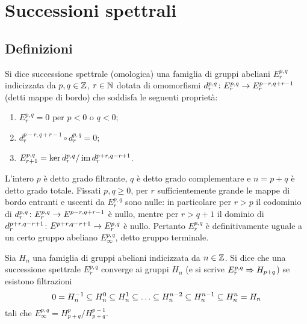 \chapter{Successioni spettrali}
\section{Definizioni}
\begin{definition}
Si dice successione spettrale (omologica) una famiglia di gruppi abeliani $E^{p,q}_r$ indicizzata da $p,q\in\mathbb{Z}$, $r\in\mathbb{N}$ dotata di omomorfismi $d^{p,q}_r\colon E^{p,q}_r\to E^{p-r,q+r-1}_r$ (detti mappe di bordo) che soddisfa le seguenti proprietà:
\begin{enumerate}
\item $E^{p,q}_r=0$ per $p<0$ o $q<0$;
\item $d^{p-r,q+r-1}_r\circ d^{p,q}_r=0$;
\item $E^{p,q}_{r+1}=\ker d^{p,q}_r/\operatorname{im} d^{p+r,q-r+1}_r$.
\end{enumerate}
\end{definition}
L'intero $p$ è detto grado filtrante, $q$ è detto grado complementare e $n=p+q$ è detto grado totale. Fissati $p,q\ge 0$, per $r$ sufficientemente grande le mappe di bordo entranti e uscenti da $E^{p,q}_r$ sono nulle: in particolare per $r>p$ il codominio di $d^{p,q}_r\colon E^{p,q}_r\to E^{p-r,q+r-1}$ è nullo, mentre per $r>q+1$ il dominio di $d^{p+r,q-r+1}_r\colon E^{p+r,q-r+1}\to E^{p,q}_r$ è nullo. Pertanto $E^{p,q}_r$ è definitivamente uguale a un certo gruppo abeliano $E^{p,q}_\infty$, detto gruppo terminale.
\begin{definition}
Sia $H_n$ una famiglia di gruppi abeliani indicizzata da $n\in\mathbb{Z}$. Si dice che una successione spettrale $E^{p,q}_r$ converge ai gruppi $H_n$ (e si scrive $E^{p,q}_r\Rightarrow H_{p+q}$) se esistono filtrazioni
$$
0=H^{-1}_n\subseteq H^0_n\subseteq H^1_n\subseteq\ldots\subseteq H^{n-2}_n\subseteq H^{n-1}_n\subseteq H^n_n=H_n
$$
tali che $E^{p,q}_\infty=H^p_{p+q}/H^{p-1}_{p+q}$.
\end{definition}

